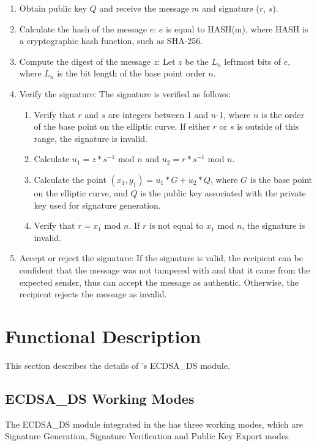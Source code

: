 \documentclass[main\_\_EN.tex]{subfiles}
\begin{document}
\begin{enumerate}
    \item Obtain public key $Q$ and receive the message $m$ and signature ($r$, $s$).
    \item Calculate the hash of the message $e$: $e$ is equal to HASH(m), where HASH is a cryptographic hash function, such as SHA-256.
    \item Compute the digest of the message $z$: Let $z$ be the $L_n$ leftmost bits of $e$, where $L_n$ is the bit length of the base point order $n$.
    \item Verify the signature: The signature is verified as follows:
        \begin{enumerate}
            \item Verify that $r$ and $s$ are integers between 1 and $n$-1, where $n$ is the order of the base point on the elliptic curve. If either $r$ or $s$ is outside of this range, the signature is invalid.
            \item Calculate $u_1 = z * s^{-1}$ mod $n$ and $u_2 = r * s^{-1}$ mod $n$.
            \item Calculate the point $(x_1, y_1) = u_1 * G + u_2 * Q$, where $G$ is the base point on the elliptic curve, and $Q$ is the public key associated with the private key used for signature generation.
            \item Verify that $r = x_1$ \textrm{mod} $n$. If $r$ is not equal to $x_1$ mod $n$, the signature is invalid.
        \end{enumerate}
    \item Accept or reject the signature: If the signature is valid, the recipient can be confident that the message was not tampered with and that it came from the expected sender, thus can accept the message as authentic. Otherwise, the recipient rejects the message as invalid.
\end{enumerate}

\section{Functional Description}

This section describes the details of \chipname{}'s ECDSA\_DS module.

\subsection{ECDSA\_DS Working Modes}

The ECDSA\_DS module integrated in the \chipname{} has three working modes, which are Signature Generation, Signature Verification and Public Key Export modes.
\end{document}
